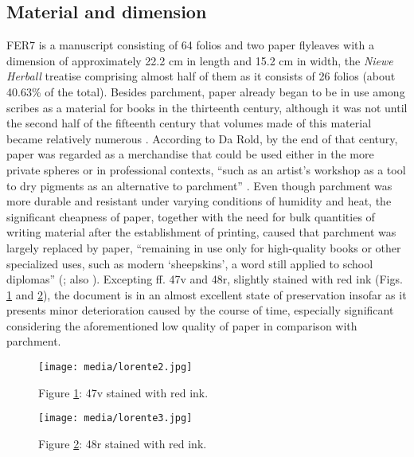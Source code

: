 \documentclass{article}
\begin{document}
\subsection{Material and dimension}

FER7 is a manuscript consisting of 64 folios and two paper flyleaves with a
dimension of approximately 22.2 cm in length and 15.2 cm in width, the
\emph{Niewe Herball} treatise comprising almost half of them as it
consists of 26 folios (about 40.63\% of the total). Besides parchment, paper already began to be in
use among scribes as a material for books in
the thirteenth century, although it was not until the second half of the
fifteenth century that volumes made of this material became relatively
numerous \citep[31]{derolez_palaeography_2003}. According to Da Rold, by the end of that
century, paper was regarded as a merchandise that could be used either
in the more private spheres or in professional contexts, ``such as an
artist's workshop as a tool to dry pigments as an alternative to
parchment'' \citep[56]{da_rold_paper_2020}.
Even though parchment was more durable and resistant under varying
conditions of humidity and heat, the significant cheapness of paper,
together with the need for bulk quantities of writing material after the
establishment of printing, caused that parchment was largely replaced by
paper, ``remaining in use only for high-quality books or other
specialized uses, such as modern `sheepskins', a word still applied to
school diplomas'' (\cite[144]{mathisen_palaeography_2008}; also \cite[5]{petti_english_1977}). Excepting
ff. 47v and 48r, slightly stained with red ink (Figs. \ref{fig:lorente2} and \ref{fig:lorente3}), the
document is in an almost excellent state of preservation
insofar as it presents minor deterioration caused by the course of time,
especially significant considering the aforementioned low quality of paper in comparison with parchment.

\begin{figure}[H]
  \centering
    \texttt{[image: media/lorente2.jpg]}
    \caption{Figure \ref{fig:lorente2}: 47v stained with red ink.}
    \label{fig:lorente2}
  \end{figure}
  
  
  \begin{figure}
    \texttt{[image: media/lorente3.jpg]}
    \caption{Figure \ref{fig:lorente3}: 48r stained with red ink.}
    \label{fig:lorente3}
  \end{figure}
\end{document}
